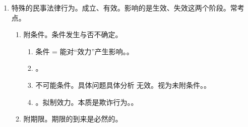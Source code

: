 \begin{enumerate}
\begin{enumerate}
\begin{enumerate}
                        \begin{kk}{未撤销前有效。或裁或诉，双重除斥期间限制}
                          \begin{enumerate}
                            \item 主观起算。重大误解 90 日，其余 1 年。胁迫自胁迫行为终止之日起 1 年内（公平原则）。
                            \item 最长 5 年。自民事法律行为发生之日起。\sjt 到期在先原则。
                            \item 行使撤销权。请求承担缔约过失责任 \hz 违约责任。
                            \item If(效力竞合)，单独分析。
                            \item 法定就这 4 种（成立时就存在的瑕疵）。vs 不可抗力、情势变更（履行中产生）。
                            \item 拿事实行为、客观事实混淆。。
                          \end{enumerate}
                        \end{kk}
                \end{enumerate}
          \item 婚姻。有效、无效、可撤销。
          \item 遗嘱/遗赠。有效、无效。。
        \end{enumerate}
  \item 特殊的民事法律行为。成立、有效。影响的是生效、失效这两个阶段。常考点。
        \begin{enumerate}
          \item 附条件。条件发生与否不确定。
                \begin{enumerate}
                  \item 条件 = 能对“效力”产生影响。。
                  \item {}。
                  \item 不可能条件。具体问题具体分析 \yi 无效。\er 视为未附条件。。
                  \item {}。拟制效力。本质是欺诈行为。。
                \end{enumerate}
          \item 附期限。期限的到来是必然的。
        \end{enumerate}
\end{enumerate}
